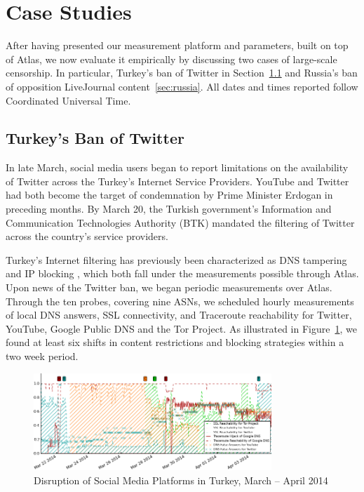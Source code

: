 \section{Case Studies}
\label{sec:case_studies}

After having presented our measurement platform and parameters, built on top of
Atlas, we now evaluate it empirically by discussing two cases of large-scale
censorship.  In particular, Turkey's ban of Twitter in
Section~\ref{sec:turkey} and Russia's ban of opposition LiveJournal content~\ref{sec:russia}. All dates and times reported follow Coordinated Universal Time.


\subsection{Turkey's Ban of Twitter}
\label{sec:turkey}

In late March, social media users began to report limitations on the
availability of Twitter across the Turkey's Internet Service Providers.
YouTube and Twitter had both become the target of condemnation by Prime Minister
Erdogan in preceding months. By March 20, the Turkish government's Information
and Communication Technologies Authority (BTK) mandated the filtering of
Twitter across the country's service providers.

Turkey's Internet filtering has previously been characterized as DNS tampering and
IP blocking \cite{akdeniz2010report}, which both fall under the measurements
possible through Atlas.  Upon news of the Twitter ban, we began periodic
measurements over Atlas.  Through the ten probes, covering nine ASNs, we
scheduled hourly measurements of local DNS answers, SSL connectivity, and
Traceroute reachability for Twitter, YouTube, Google Public DNS and the Tor
Project.  As illustrated in Figure~\ref{image:tr-social_media_filtering}, we
found at least six shifts in content restrictions and blocking strategies
within a two week period.

\begin{figure}
  \centering
  \includegraphics[width=0.8\textwidth]{resources/tr-20140321-20140407-social_media_filtering.png}
  \caption{Disruption of Social Media Platforms in Turkey, March -- April 2014}
  \label{image:tr-social_media_filtering}
\end{figure}


